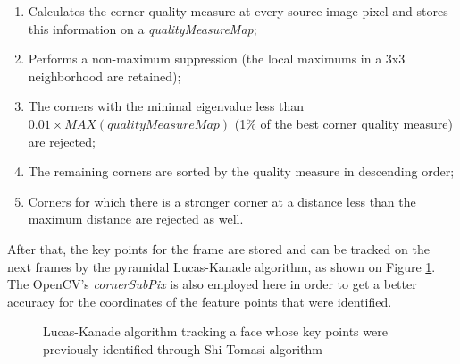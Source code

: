 \documentclass[msc, a4paper, classic, en]{ufbathesis}
\begin{document}
\begin{enumerate}
  \item Calculates the corner quality measure at every source image pixel and stores this information on a \textit{qualityMeasureMap};
  \item Performs a non-maximum suppression (the local maximums in a 3x3 neighborhood are retained);
  \item The corners with the minimal eigenvalue less than $0.01 \times MAX(qualityMeasureMap)$ (1\% of the best corner quality measure) are rejected;
  \item The remaining corners are sorted by the quality measure in descending order;
  \item Corners for which there is a stronger corner at a distance less than the maximum distance are rejected as well.
\end{enumerate}

After that, the key points for the frame are stored and can be tracked on the next frames by the pyramidal Lucas-Kanade algorithm, as shown on Figure \ref{fig:lk}. The OpenCV's \textit{cornerSubPix} is also employed here in order to get a better accuracy for the coordinates of the feature points that were identified.

\begin{figure}
\centering
{}
\caption{Lucas-Kanade algorithm tracking a face whose key points were previously identified through Shi-Tomasi algorithm}
\label{fig:lk}
\end{figure}
\end{document}
